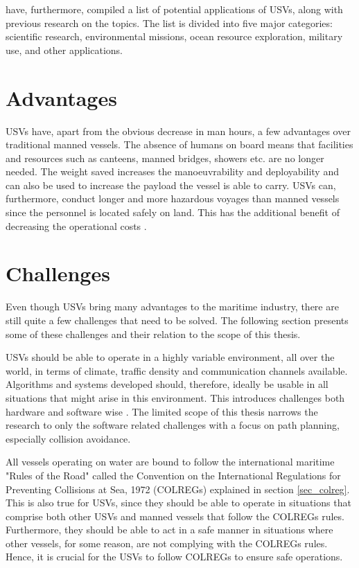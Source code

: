 \textcite{liu2016unmanned} have, furthermore, compiled a list of potential applications of USVs, along with previous research on the topics.
The list is divided into five major categories: scientific research, environmental missions, ocean resource exploration, military use, and other applications. 

\section{Advantages}
USVs have, apart from the obvious decrease in man hours, a few advantages over traditional manned vessels. The absence of humans on board means that facilities and resources such as canteens,  manned bridges, showers etc. are no longer needed. The weight saved increases the manoeuvrability and deployability and can also be used to increase the payload the vessel is able to carry. USVs can, furthermore, conduct longer and more hazardous voyages than manned vessels since the personnel is located safely on land. This has the additional benefit of decreasing the operational costs \cite{liu2016unmanned}.

\section{Challenges}
Even though USVs bring many advantages to the maritime industry, there are still quite a few challenges that need to be solved. The following section presents some of these challenges and their relation to the scope of this thesis.


USVs should be able to operate in a highly variable environment, all over the world, in terms of climate, traffic density and communication channels available.  Algorithms and systems developed should, therefore, ideally be usable in all situations that might arise in this environment. This introduces challenges both hardware and software wise \cite{liu2016unmanned}. The limited scope of this thesis narrows the research to only the software related challenges with a focus on path planning, especially collision avoidance. 

All vessels operating on water are bound to follow the international maritime "Rules of the Road" called the Convention on the International Regulations for Preventing Collisions at Sea, 1972 (COLREGs) explained in section \ref{sec_colreg}. This is also true for USVs, since they should be able to operate in situations that comprise both other USVs and manned vessels that follow the COLREGs rules. Furthermore, they should be able to  act in a safe manner in situations where other vessels, for some reason, are not complying with the COLREGs rules. Hence, it is crucial for the USVs to follow COLREGs to ensure safe operations.

